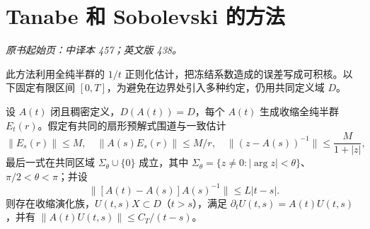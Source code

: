 \section{Tanabe 和 Sobolevski 的方法}\label{sec:yosida-14-05}
\noindent\textit{原书起始页：中译本 457；英文版 438。}

此方法利用全纯半群的 $1/t$ 正则化估计，把冻结系数造成的误差写成可积核。以下固定有限区间 $[0,T]$，为避免在边界处引入多种约定，仍用共同定义域 $D$。

\begin{theorem}\label{thm:y14-tanabe}
设 $A(t)$ 闭且稠密定义，$D(A(t))=D$，每个 $A(t)$ 生成收缩全纯半群 $E_t(r)$。假定有共同的扇形预解式围道与一致估计
\[
 \|E_s(r)\|\le M,\quad \|A(s)E_s(r)\|\le M/r,\quad
 \|(z-A(s))^{-1}\|\le\frac{M}{1+|z|},
\]
最后一式在共同区域 $\Sigma_\theta\cup\{0\}$ 成立，其中 $\Sigma_\theta=\{z\ne0:|\arg z|<\theta\}$、$\pi/2<\theta<\pi$；并设
\[
 \|[A(t)-A(s)]A(s)^{-1}\|\le L|t-s|.
\]
则存在收缩演化族，$U(t,s)X\subset D$（$t>s$），满足 $\partial_tU(t,s)=A(t)U(t,s)$，并有 $\|A(t)U(t,s)\|\le C_T/(t-s)$。
\end{theorem}

